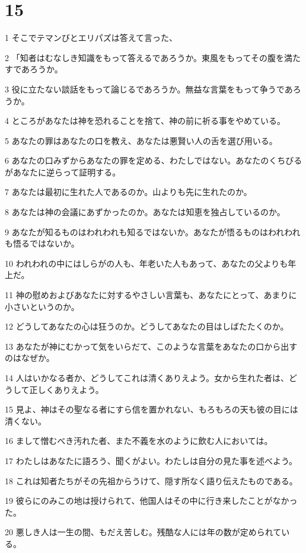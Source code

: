 \chapter{15}

\par 1 そこでテマンびとエリパズは答えて言った、
\par 2 「知者はむなしき知識をもって答えるであろうか。東風をもってその腹を満たすであろうか。
\par 3 役に立たない談話をもって論じるであろうか。無益な言葉をもって争うであろうか。
\par 4 ところがあなたは神を恐れることを捨て、神の前に祈る事をやめている。
\par 5 あなたの罪はあなたの口を教え、あなたは悪賢い人の舌を選び用いる。
\par 6 あなたの口みずからあなたの罪を定める、わたしではない。あなたのくちびるがあなたに逆らって証明する。
\par 7 あなたは最初に生れた人であるのか。山よりも先に生れたのか。
\par 8 あなたは神の会議にあずかったのか。あなたは知恵を独占しているのか。
\par 9 あなたが知るものはわれわれも知るではないか。あなたが悟るものはわれわれも悟るではないか。
\par 10 われわれの中にはしらがの人も、年老いた人もあって、あなたの父よりも年上だ。
\par 11 神の慰めおよびあなたに対するやさしい言葉も、あなたにとって、あまりに小さいというのか。
\par 12 どうしてあなたの心は狂うのか。どうしてあなたの目はしばたたくのか。
\par 13 あなたが神にむかって気をいらだて、このような言葉をあなたの口から出すのはなぜか。
\par 14 人はいかなる者か、どうしてこれは清くありえよう。女から生れた者は、どうして正しくありえよう。
\par 15 見よ、神はその聖なる者にすら信を置かれない、もろもろの天も彼の目には清くない。
\par 16 まして憎むべき汚れた者、また不義を水のように飲む人においては。
\par 17 わたしはあなたに語ろう、聞くがよい。わたしは自分の見た事を述べよう。
\par 18 これは知者たちがその先祖からうけて、隠す所なく語り伝えたものである。
\par 19 彼らにのみこの地は授けられて、他国人はその中に行き来したことがなかった。
\par 20 悪しき人は一生の間、もだえ苦しむ。残酷な人には年の数が定められている。
